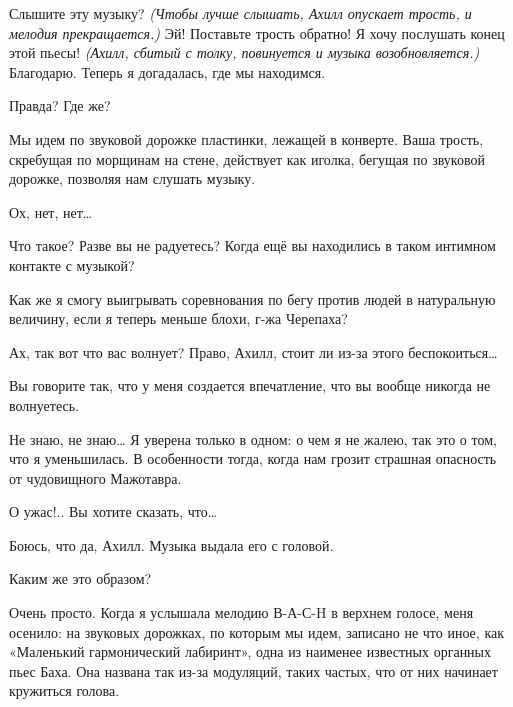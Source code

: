 \documentclass[../main.tex]{subfiles}
\begin{document}
\begin{Dialogue}
\begin{sublevel}
\begin{sublevel}
\begin{sublevel}
 Слышите эту музыку? \emph{(Чтобы лучше слышать, Ахилл опускает трость, и мелодия прекращается.)} Эй! Поставьте трость обратно! Я хочу послушать конец этой пьесы! \emph{(Ахилл, сбитый с толку, повинуется и музыка возобновляется.)} Благодарю. Теперь я догадалась, где мы находимся.


 Правда? Где же?

 Мы идем по звуковой дорожке пластинки, лежащей в конверте. Ваша трость, скребущая по морщинам на стене, действует как иголка, бегущая по звуковой дорожке, позволяя нам слушать музыку.

 Ох, нет, нет\ldots{}

 Что такое? Разве вы не радуетесь? Когда ещё вы находились в таком интимном контакте с музыкой?

 Как же я смогу выигрывать соревнования по бегу против людей в натуральную величину, если я теперь меньше блохи, г-жа Черепаха?

 Ах, так вот что вас волнует? Право, Ахилл, стоит ли из-за этого беспокоиться\ldots{}

 Вы говорите так, что у меня создается впечатление, что вы вообще никогда не волнуетесь.

 Не знаю, не знаю\ldots{} Я уверена только в одном: о чем я не жалею, так это о том, что я уменьшилась. В особенности тогда, когда нам грозит страшная опасность от чудовищного Мажотавра.

 О ужас!.. Вы хотите сказать, что\ldots{}

 Боюсь, что да, Ахилл. Музыка выдала его с головой.

 Каким же это образом?

 Очень просто. Когда я услышала мелодию В-А-С-H в верхнем голосе, меня осенило: на звуковых дорожках, по которым мы идем, записано не что иное, как «Маленький гармонический лабиринт», одна из наименее известных органных пьес Баха. Она названа так из-за модуляций, таких частых, что от них начинает кружиться голова.


\end{sublevel}
\end{sublevel}
\end{sublevel}
\end{Dialogue}
\end{document}
